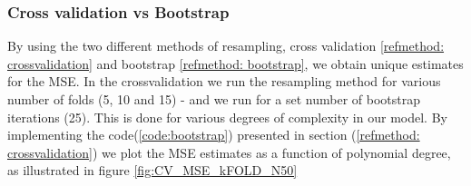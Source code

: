 \documentclass[../main.tex]{subfiles}
\begin{document}
\clearpage
\subsubsection{Cross validation vs Bootstrap}\label{res:cv vs bs ols}
By using the two different methods of resampling, cross validation \eqref{refmethod: crossvalidation} and bootstrap \eqref{refmethod: bootstrap}, we obtain unique estimates for the MSE. In the crossvalidation we run the resampling method for various number of folds (5, 10 and 15) - and we run for a set number of bootstrap iterations (25). This is done for various degrees of complexity in our model. By implementing the code(\ref{code:bootstrap}) presented in section (\ref{refmethod: crossvalidation}) we plot the MSE estimates as a function of polynomial degree, as illustrated in figure \eqref{fig:CV_MSE_kFOLD_N50}
\vskip0.1in
\end{document}
